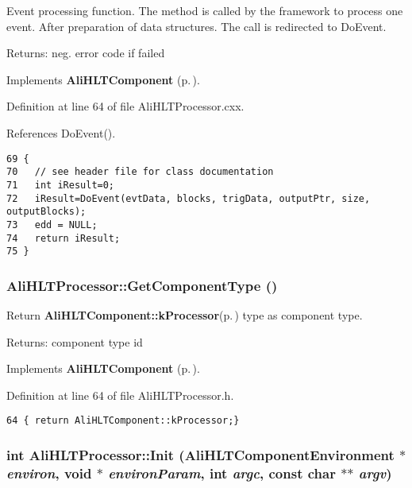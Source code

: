 Event processing function. The method is called by the framework to process one event. After preparation of data structures. The call is redirected to Do\-Event. \begin{Desc}
\item[Returns:]neg. error code if failed \end{Desc}


Implements {\bf Ali\-HLTComponent} {\rm (p.\,\pageref{classAliHLTComponent_a7})}.

Definition at line 64 of file Ali\-HLTProcessor.cxx.

References Do\-Event().

\footnotesize\begin{verbatim}69 {
70   // see header file for class documentation
71   int iResult=0;
72   iResult=DoEvent(evtData, blocks, trigData, outputPtr, size, outputBlocks);
73   edd = NULL;
74   return iResult;
75 }
\end{verbatim}\normalsize 


\subsubsection{ Ali\-HLTProcessor::Get\-Component\-Type ()\hspace{0.3cm}{\tt  [inline, virtual]}}\label{classAliHLTProcessor_a5}


Return {\bf Ali\-HLTComponent::k\-Processor}{\rm (p.\,\pageref{classAliHLTComponent_w9w2})} type as component type. \begin{Desc}
\item[Returns:]component type id \end{Desc}


Implements {\bf Ali\-HLTComponent} {\rm (p.\,\pageref{classAliHLTComponent_a8})}.

Definition at line 64 of file Ali\-HLTProcessor.h.

\footnotesize\begin{verbatim}64 { return AliHLTComponent::kProcessor;}
\end{verbatim}\normalsize 


\subsubsection{\setlength{\rightskip}{0pt plus 5cm}int Ali\-HLTProcessor::Init ({\bf Ali\-HLTComponent\-Environment} $\ast$ {\em environ}, void $\ast$ {\em environ\-Param}, int {\em argc}, const char $\ast$$\ast$ {\em argv})\hspace{0.3cm}{\tt  [virtual]}}\label{classAliHLTProcessor_a2}


